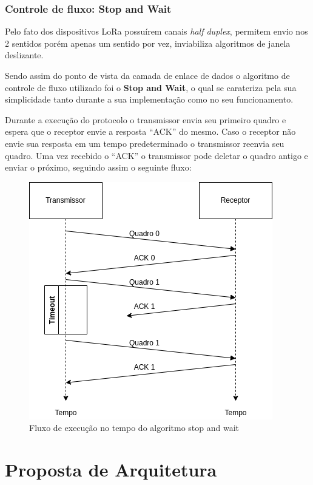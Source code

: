 \documentclass[
article,			%
12pt,				%
oneside,			%
a4paper,			%
english,			%
brazil,				%
sumario=tradicional
]{abntex2}
\begin{document}
\subsubsection{Controle de fluxo: Stop and Wait}\label{Stop and Wait}
Pelo fato dos dispositivos LoRa possuírem canais \textit{half duplex}, permitem envio nos 2 sentidos porém apenas um sentido por vez, inviabiliza algoritmos de janela deslizante.

Sendo assim do ponto de vista da camada de enlace de dados o algoritmo de controle de fluxo utilizado foi o \textbf{Stop and Wait}, o qual se carateriza pela sua simplicidade tanto durante a sua implementação como no seu funcionamento.

Durante a execução do protocolo o transmissor envia seu primeiro quadro e espera que o receptor envie a resposta ``ACK'' do mesmo. Caso o receptor não envie sua resposta em um tempo predeterminado o transmissor reenvia seu quadro. Uma vez recebido o ``ACK'' o transmissor pode deletar o quadro antigo e enviar o próximo, seguindo assim o seguinte fluxo:

\begin{figure}[!htb]
    \centering
    \includegraphics[width=.8\textwidth]{stop_and_wait}
    \caption{\label{fig:stop_and_wait}Fluxo de execução no tempo do algoritmo stop and wait}
\end{figure}



\cleardoublepage
\section{Proposta de Arquitetura}\label{Proposta de Arquitetura}
\end{document}
